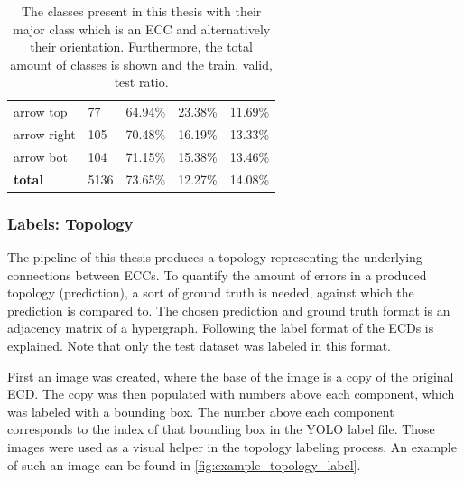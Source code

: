 \begin{table}
\begin{center}
\begin{tabular}{l|l|l|l|l|}
    arrow top               & 77     &  64.94\%  &   23.38\%  & 11.69\% \\
    arrow right             & 105    &  70.48\%  &   16.19\%  & 13.33\% \\
    arrow bot               & 104    &  71.15\%  &   15.38\%  & 13.46\% \\
    \hline
    \textbf{total}          & 5136   &  73.65\%  &   12.27\%  & 14.08\% \\
\end{tabular}
\caption{The classes present in this thesis with their major class which is an \ac{ECC} and alternatively their orientation. Furthermore, the total amount of classes is shown and the train, valid, test ratio.}
\label{tab:yolo_classes}
\end{center}
\end{table}

\subsubsection{Labels: Topology}
\label{sec:hypergraph_topology}

The pipeline of this thesis produces a topology representing the underlying connections between \acp{ECC}.
To quantify the amount of errors in a produced topology (prediction), a sort of ground truth is needed, against which the prediction is compared to.
The chosen prediction and ground truth format is an adjacency matrix of a hypergraph.
Following the label format of the \acp{ECD} is explained.
Note that only the test dataset was labeled in this format.

First an image was created, where the base of the image is a copy of the original \ac{ECD}.
The copy was then populated with numbers above each component, which was labeled with a bounding box.
The number above each component corresponds to the index of that bounding box in the YOLO label file.
Those images were used as a visual helper in the topology labeling process.
An example of such an image can be found in \ref{fig:example_topology_label}.

